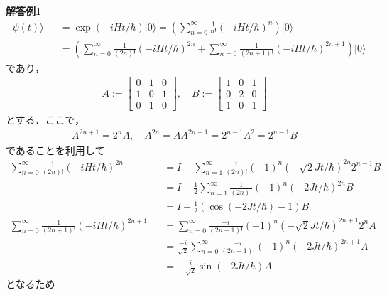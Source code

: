 \documentclass[12pt,dvipdfmx]{jsarticle}
\begin{document}
\textbf{解答例1}\\
\begin{eqnarray}
  |\psi(t)\rangle &&= \exp( -iHt/\hbar )|0\rangle = \left( \sum_{n=0}^{\infty}\frac{1}{n!}(-iHt/\hbar)^n  \right)|0\rangle\\
  &&= \left( \sum_{n=0}^{\infty}\frac{1}{(2n)!}(-iHt/\hbar)^{2n} + \sum_{n=0}^{\infty}\frac{1}{(2n+1)!}(-iHt/\hbar)^{2n+1} \right)|0\rangle
\end{eqnarray}
であり，
\begin{eqnarray}
  A:= 
  \begin{bmatrix}
    0 & 1& 0\\
    1 & 0 & 1\\
    0 & 1& 0
  \end{bmatrix},\quad
  B:=
  \begin{bmatrix}
    1 & 0 & 1\\
    0 & 2& 0\\
    1 & 0 & 1
  \end{bmatrix}
\end{eqnarray}
とする．ここで，
\begin{eqnarray}
  A^{2n+1} = 2^nA, \quad A^{2n} = A A^{2n-1} = 2^{n-1}A^2 = 2^{n-1}B 
\end{eqnarray}
であることを利用して
\begin{eqnarray}
  \sum_{n=0}^{\infty}\frac{1}{(2n)!}(-iHt/\hbar)^{2n} &&= I + \sum_{n=1}^{\infty} \frac{1}{(2n)!}(-1)^n (-\sqrt{2}J t/\hbar)^{2n}2^{n-1} B\\
  &&= I + \frac{1}{2}\sum_{n=1}^{\infty} \frac{1}{(2n)!}(-1)^n (-2J t/\hbar)^{2n} B\\
  &&= I + \frac{1}{2}\left( \cos(-2J t/\hbar)-1 \right)B\\
  \sum_{n=0}^{\infty}\frac{1}{(2n+1)!}(-iHt/\hbar)^{2n+1} &&= \sum_{n=0}^{\infty} \frac{-i}{(2n+1)!}(-1)^n (-\sqrt{2}J t/\hbar)^{2n+1}2^n A\\
  &&= \frac{-i}{\sqrt{2}}\sum_{n=0}^{\infty} \frac{-i}{(2n+1)!}(-1)^n (-2J t/\hbar)^{2n+1} A\\
  &&= -\frac{i}{\sqrt{2}}\sin(-2J t/\hbar)A
\end{eqnarray}
となるため
\end{document}
